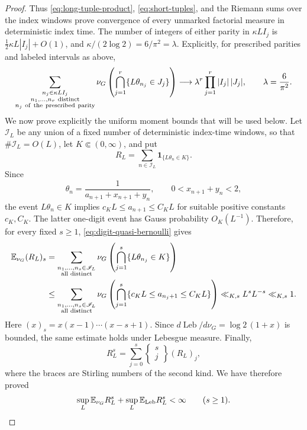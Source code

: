 \documentclass[11pt]{article}
\numberwithin{equation}{section}
\theoremstyle{definition}
\newcommand{\E}{\mathbb E}
\newcommand{\1}{\mathbf 1}
\newcommand{\Leb}{\operatorname{Leb}}
\begin{document}
\begin{proof}
Thus \eqref{eq:long-tuple-product}, \eqref{eq:short-tuples}, and the
Riemann sums over the index windows prove convergence of every unmarked
factorial measure in deterministic index time.  The number of integers
of either parity in \(\kappa L I_j\) is
\(\frac12\kappa L|I_j|+O(1)\), and
\(\kappa/(2\log2)=6/\pi^2=\lambda\).  Explicitly, for prescribed
parities and labeled intervals as above,
\begin{equation}\label{eq:unmarked-factorial-limit}
 \sum_{\substack{n_j\in\kappa L I_j\\
                  n_1,\ldots,n_r\ {\rm distinct}\\
                  n_j\ {\rm of\ the\ prescribed\ parity}}}
 \nu_G\left(\bigcap_{j=1}^r
       \{L\theta_{n_j}\in J_j\}\right)
 \longrightarrow
 \lambda^r\prod_{j=1}^r|I_j|\,|J_j|,
 \qquad \lambda=\frac6{\pi^2}.
\end{equation}
We now prove explicitly
the uniform moment bounds that will be used below.  Let \(\mathscr I_L\) be
any union of a fixed number of deterministic index-time windows, so that
\(\#\mathscr I_L=O(L)\), let \(K\Subset(0,\infty)\), and put
\[
 R_L=\sum_{n\in\mathscr I_L}\1_{\{L\theta_n\in K\}}.
\]
Since
\[
 \theta_n=\frac1{a_{n+1}+x_{n+1}+y_n},\qquad
 0<x_{n+1}+y_n<2,
\]
the event \(L\theta_n\in K\) implies
\(c_KL\le a_{n+1}\le C_KL\) for suitable positive constants
\(c_K,C_K\).  The latter one-digit event has Gauss probability
\(O_K(L^{-1})\).  Therefore, for every fixed \(s\ge1\),
\eqref{eq:digit-quasi-bernoulli} gives
\begin{align}
 \E_{\nu_G}(R_L)_s
 &=\sum_{\substack{n_1,\ldots,n_s\in\mathscr I_L\\
                  \text{all distinct}}}
   \nu_G\left(\bigcap_{j=1}^s
        \{L\theta_{n_j}\in K\}\right) \notag\\
 &\le
 \sum_{\substack{n_1,\ldots,n_s\in\mathscr I_L\\
                  \text{all distinct}}}
   \nu_G\left(\bigcap_{j=1}^s
        \{c_KL\le a_{n_j+1}\le C_KL\}\right)
 \ll_{K,s}L^sL^{-s}\ll_{K,s}1.
 \label{eq:rare-factorial-bound}
\end{align}
Here \((x)_s=x(x-1)\cdots(x-s+1)\).  Since
\(d\Leb/d\nu_G=\log2\,(1+x)\) is bounded, the same estimate
holds under Lebesgue measure.  Finally,
\begin{equation}\label{eq:ordinary-factorial-identity}
 R_L^s=\sum_{j=0}^s
 \left\{\begin{matrix}s\\ j\end{matrix}\right\}(R_L)_j,
\end{equation}
where the braces are Stirling numbers of the second kind.  We have
therefore proved
\begin{equation}\label{eq:rare-count-moments}
 \sup_L\E_{\nu_G}R_L^s+\sup_L\E_{\rm Leb}R_L^s<\infty
 \qquad(s\ge1).
\end{equation}


\end{proof}
\end{document}
